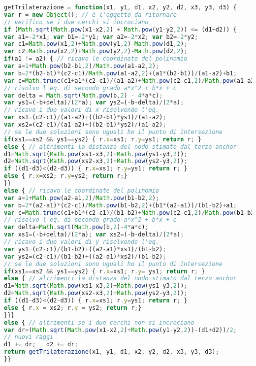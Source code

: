\begin{lstlisting}[language=JavaScript, label=cod:trilaterazione, caption=Algoritmo di trilaterazione]
getTrilaterazione = function(x1, y1, d1, x2, y2, d2, x3, y3, d3) {
var r = new Object(); // è l'oggetto da ritornare
// verifico se i due cerchi si incrociano
if (Math.sqrt(Math.pow(x1-x2,2) + Math.pow(y1-y2,2)) <= (d1+d2)) {
var a1=-2*x1; var b1=-2*y1; var a2=-2*x2; var b2=-2*y2;
var c1=Math.pow(x1,2)+Math.pow(y1,2)-Math.pow(d1,2);
var c2=Math.pow(x2,2)+Math.pow(y2,2)-Math.pow(d2,2);
if(a1 != a2) { // ricavo le coordinate del polinomio
var a=1+Math.pow(b2-b1,2)/Math.pow(a1-a2,2);
var b=2*(b2-b1)*(c2-c1)/Math.pow(a1-a2,2)+(a1*(b2-b1))/(a1-a2)+b1;
var c=Math.trunc(c1+a1*(c2-c1)/(a1-a2)+Math.pow(c2-c1,2)/Math.pow(a1-a2,2));
// risolvo l'eq. di secondo grado a*x^2 + b*x + c
var delta = Math.sqrt(Math.pow(b,2) - 4*a*c);
var ys1=(-b+delta)/(2*a); var ys2=(-b-delta)/(2*a);
// ricavo i due valori di x risolvendo l'eq.
var xs1=(c2-c1)/(a1-a2)+((b2-b1)*ys1)/(a1-a2);
var xs2=(c2-c1)/(a1-a2)+((b2-b1)*ys2)/(a1-a2);
// se le due soluzioni sono uguali ho il punto di intersezione
if(xs1==xs2 && ys1==ys2) { r.x=xs1; r.y=ys1; return r; }
else { // altrimenti la distanza del nodo stimato dal terzo anchor
d1=Math.sqrt(Math.pow(xs1-x3,2)+Math.pow(ys1-y3,2));
d2=Math.sqrt(Math.pow(xs2-x3,2)+Math.pow(ys2-y3,2));
if ((d1-d3)<(d2-d3)) { r.x=xs1; r.y=ys1; return r; }
else { r.x=xs2; r.y=ys2; return r;}
}}
else { // ricavo le coordinate del polinomio
var a=1+Math.pow(a2-a1,2)/Math.pow(b1-b2,2);
var b=2*(a2-a1)*(c2-c1)/Math.pow(b1-b2,2)+(b1*(a2-a1))/(b1-b2)+a1;
var c=Math.trunc(c1+b1*(c2-c1)/(b1-b2)+Math.pow(c2-c1,2)/Math.pow(b1-b2,2));
// risolvo l'eq. di secondo grado a*x^2 + b*x + c
var delta=Math.sqrt(Math.pow(b,2)-4*a*c);
var xs1=(-b+delta)/(2*a); var xs2=(-b-delta)/(2*a);
// ricavo i due valori di y risolvendo l'eq.
var ys1=(c2-c1)/(b1-b2)+((a2-a1)*xs1)/(b1-b2);
var ys2=(c2-c1)/(b1-b2)+((a2-a1)*xs2)/(b1-b2);
// se le due soluzioni sono uguali ho il punto di intersezione
if(xs1==xs2 && ys1==ys2) { r.x=xs1; r.y= ys1; return r; }
else { // altrimenti la distanza del nodo stimato dal terzo anchor
d1=Math.sqrt(Math.pow(xs1-x3,2)+Math.pow(ys1-y3,2));
d2=Math.sqrt(Math.pow(xs2-x3,2)+Math.pow(ys2-y3,2));
if ((d1-d3)<(d2-d3)) { r.x=xs1;	r.y=ys1; return r; }
else { r.x = xs2; r.y = ys2; return r;}
}}}
else { // altrimenti se i due cerchi non si incrociano
var dr=(Math.sqrt(Math.pow(x1-x2,2)+Math.pow(y1-y2,2))-(d1+d2))/2;
// nuovi raggi
d1 += dr;	d2 += dr;
return getTrilaterazione(x1, y1, d1, x2, y2, d2, x3, y3, d3);
}}
\end{lstlisting}

